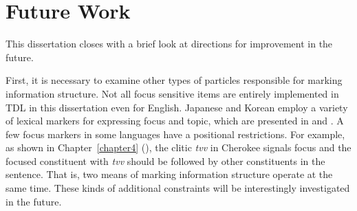 \section{Future Work}
\label{15:sec:future}

This dissertation closes with a brief look at directions for
improvement in the future. 





First, it is necessary to examine other types of particles responsible
for marking information structure.  Not all focus sensitive items are
entirely implemented in TDL in this dissertation even for
English. Japanese and Korean employ a variety of lexical markers for
expressing focus and topic, which are presented in \citet{hasegawa:11}
and \citet{lee:04}. A few focus markers in some languages have a
positional restrictions. For example, as shown in
Chapter~\ref{chapter4} (), the clitic \textit{tvv}
in Cherokee signals focus and the focused constituent with
\textit{tvv} should be followed by other constituents in the
sentence. That is, two means of marking information structure operate
at the same time. These kinds of additional constraints will be
interestingly investigated in the future.


